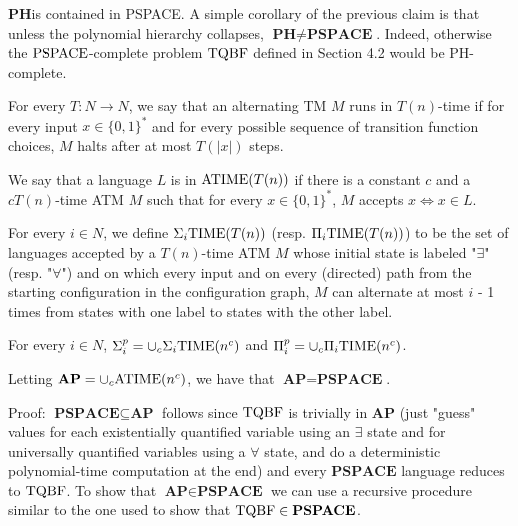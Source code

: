 \begin{note}
$\textbf{PH} $is contained in PSPACE. A simple corollary of the previous claim is that unless the polynomial hierarchy collapses, $\textbf{PH} \neq \textbf{PSPACE}$. Indeed, otherwise the $\mathrm{PSPACE}$-complete problem $\mathrm{TQBF}$ defined in Section 4.2 would be PH-complete.
\end{note}

\begin{note}
For every $T : N \to N$, we say that an alternating TM $M$ runs in $T(n)$-time if for every input $x \in \{0, 1\}^{\ast}$ and for every possible sequence of transition function choices, $M$ halts after at most $T(|x|)$ steps.

We say that a language $L$ is in $\mathrm{ATIME}(T(n))$ if there is a constant $c$ and a $cT(n)$-time ATM $M$ such that for every $x \in \{0, 1\}^{\ast}$, $M$ accepts $x \iff x \in L$.
\end{note}

\begin{note}
For every $i \in N$, we define $\Sigma_{i} \mathrm{TIME}(T(n))$ (resp. $\Pi_{i}\mathrm{TIME}(T(n))$) to be the set of languages accepted by a $T(n)$-time ATM $M$ whose initial state is labeled "$\exists$" (resp. "$\forall$") and on which every input and on every (directed) path from the starting configuration in the configuration graph, $M$ can alternate at most $i$ - 1 times from states with one label to states with the other label.
\end{note}

\begin{note}
For every $i \in N$, $\Sigma_{i}^{p} = \cup_{c}\Sigma_{i}\mathrm{TIME}(n^c)$ and $\Pi_{i}^{p} = \cup_{c} \Pi_{i} \mathrm{TIME}(n^c)$.
\end{note}

\begin{note}
Letting $\textbf{AP} = \cup_{c} \mathrm{ATIME}(n^c)$, we have that $\textbf{AP} = \textbf{PSPACE}$.

Proof: $\textbf{PSPACE} \subseteq \textbf{AP}$ follows since $\mathrm{TQBF}$ is trivially in $\textbf{AP}$ (just "guess" values for each existentially quantified variable using an $\exists$ state and for universally quantified variables using a $\forall$ state, and do a deterministic polynomial-time computation at the end) and every $\textbf{PSPACE}$ language reduces to $\mathrm{TQBF}$. To show that $\textbf{AP} \in \textbf{PSPACE}$ we can use a recursive procedure similar to the one used to show that $\mathrm{TQBF} \in \textbf{PSPACE}$. 
\end{note}


